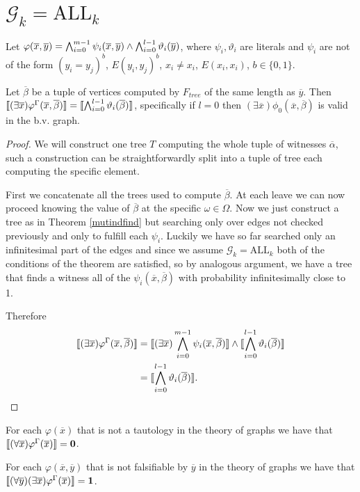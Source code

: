 \section{$\mathcal{G}_k=\text{ALL}_k$}

\begin{thrm}
Let $\varphi(\overline x,\overline y)=\bigwedge_{i=0}^{m-1}\psi_i(\overline x,\overline y)\land \bigwedge_{i=0}^{l-1}\vartheta_i(\overline y)$, where $\psi_i,\vartheta_i$ are literals and $\psi_i$ are not of the form $(y_i=y_j)^b$, $E(y_i,y_j)^b$, $x_i\not= x_i$, $E(x_i,x_i)$, $b\in\{0,1\}$.

Let $\overline \beta$ be a tuple of vertices computed by $F_{tree}$ of the same length as $\overline y$. Then $\llbracket(\exists \overline x)\varphi^\Gamma(\overline x,\overline \beta)\rrbracket=\llbracket\bigwedge_{i=0}^{l-1}\vartheta_i(\overline \beta)\rrbracket$, specifically if $l=0$ then $(\exists \overline x)\phi_0(\overline x,\overline \beta)$ is valid in the b.v. graph.
\end{thrm}
\begin{proof} We will construct one tree $T$ computing the whole tuple of witnesses $\overline \alpha$, such a construction can be straightforwardly split into a tuple of tree each computing the specific element.

First we concatenate all the trees used to compute $\overline \beta$. At each leave we can now proceed knowing the value of $\overline \beta$ at the specific $\omega\in\Omega$. Now we just construct a tree as in Theorem \ref{mutindfind} but searching only over edges not checked previously and only to fulfill each $\psi_i$. Luckily we have so far searched only an infinitesimal part of the edges and since we assume $\mathcal{G}_k=\text{ALL}_k$ both of the conditions of the theorem are satisfied, so by analogous argument, we have a tree that finds a witness all of the $\psi_i(\overline x,\overline \beta)$ with probability infinitesimally close to 1.

Therefore
\begin{align}
\llbracket(\exists \overline x)\varphi^\Gamma(\overline x,\overline \beta)\rrbracket&=\llbracket(\exists \overline x)\bigwedge_{i=0}^{m-1}\psi_i(\overline x,\overline \beta)\rrbracket \land \llbracket\bigwedge_{i=0}^{l-1}\vartheta_i(\overline \beta)\rrbracket\\
&=\llbracket\bigwedge_{i=0}^{l-1}\vartheta_i(\overline \beta)\rrbracket.
\end{align}
\end{proof}

\begin{crll}
For each $\varphi(\overline x)$ that is not a tautology in the theory of graphs we have that $\llbracket(\forall \overline x)\varphi^\Gamma(\overline x)\rrbracket=\textbf{0}$.
\end{crll}
\begin{crll}
For each $\varphi(\overline x,\overline y)$ that is not falsifiable by $\overline y$ in the theory of graphs we have that $\llbracket(\forall \overline y)(\exists \overline x)\varphi^\Gamma(\overline x)\rrbracket=\textbf{1}$.
\end{crll}

